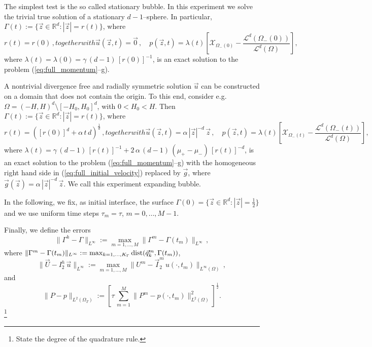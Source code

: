\documentclass[a4paper,12pt,onecolumn]{article}
\newcommand{\R}{{\mathbb R}}
\newcommand{\bigchi}{\ensuremath{\mathrm{\mathcal{X}}}}
\newcommand{\charfcn}[1]{\bigchi_{#1}} %
\newcommand{\errorXx}{\|\Gamma^h - \Gamma\|_{L^\infty}}
\newcommand{\errorUu}[1]{\|\vec U - I^h_{#1}\,\vec u\|_{L^\infty}}
\newcommand{\LerrorPp}{\|P - p\|_{L^2(\Omega_T)}}
\begin{document}
The simplest test is the so called stationary bubble. In this experiment we solve the trivial true solution of a stationary $d-1$--sphere. In particular, $\Gamma(t) := \{ \vec z \in \R^d : |\vec z| = r(t)\}$, where
\begin{subequations}
\begin{equation} \label{eq:radialr}
r(t) = r(0)\,,
\end{equation}
together with 
\begin{equation} \label{eq:radialup}
\vec u(\vec z, t) = \vec 0 \,,\quad p(\vec z, t) = \lambda(t)\left[\charfcn{\Omega_-(0)} -\frac{\mathcal{L}^d(\Omega_-(0))}{\mathcal{L}^d(\Omega)} \right] ,
\end{equation}
\end{subequations}
where $\lambda(t) = \lambda(0) = \gamma\,(d-1)\,[r(0)]^{-1}$, is an exact solution to the problem (\ref{eq:full_momentum}--g).

A nontrivial divergence free and radially symmetric solution $\vec u$ can be constructed on a domain that does not contain the origin. To this end, consider e.g.\ $\Omega = (-H,H)^d \setminus [-H_0, H_0]^d$, with $0 < H_0 < H$. Then $\Gamma(t) := \{ \vec z \in \R^d : |\vec z| = r(t)\}$, where
\begin{subequations}
\begin{equation} \label{eq:radialr2}
r(t) = ([r(0)]^d + \alpha\,t\,d)^\frac1d \,,
\end{equation}
together with 
\begin{equation} \label{eq:radialup2}
\vec u(\vec z, t) = \alpha\,|\vec z|^{-d}\,\vec z \,, \quad p(\vec z, t) = \lambda(t)\left[ \charfcn{\Omega_-(t)} - \frac{\mathcal{L}^d(\Omega_-(t))}{\mathcal{L}^d(\Omega)}\right],
\end{equation}
\end{subequations}
where $\lambda(t) = \gamma\,(d-1)\,[r(t)]^{-1} + 2\,\alpha\,(d-1)\,(\mu_+ - \mu_-)\,[r(t)]^{-d}$, is an exact solution to the problem (\ref{eq:full_momentum}--g) with the homogeneous right hand side in (\ref{eq:full_initial_velocity}) replaced by $\vec g$, where $\vec g(\vec z) = \alpha\,|\vec z|^{-d}\,\vec z$. We call this experiment expanding bubble.

In the following, we fix, as initial interface, the surface $\Gamma(0) = \{ \vec z \in \R^d : |\vec z| = \frac12 \}$ and we use uniform time steps $\tau_m=\tau$, $m=0,\ldots, M-1$.

Finally, we define the errors 
\begin{equation} \label{eq:errorXx}
\errorXx := \max_{m=1,\ldots, M} \|\Gamma^m - \Gamma(t_m)\|_{L^\infty}\,, 
\end{equation}
where $\|\Gamma^m - \Gamma(t_m)\|_{L^\infty} := 
\max_{k=1,\ldots, K_\Gamma} {\rm dist}( \vec{q}^m_k, \Gamma(t_m))$,
\begin{equation*} 
\errorUu2 := \max_{m=1,\ldots, M}\|U^m - \vec I^m_2\,u(\cdot,t_m)\|_{L^\infty(\Omega)}\,, 
\end{equation*}
and
\begin{equation*}
\LerrorPp := \left[\tau\,\sum_{m=1}^M \|P^m - p(\cdot,t_m)\|_{L^2(\Omega)}^2 
\right]^\frac12 .
\end{equation*}
\footnote{State the degree of the quadrature rule.}
\end{document}
